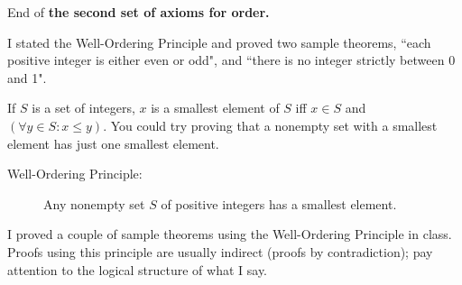 \documentclass[12pt]{article}
\begin{document}
End of {\bf the second set of axioms for order.}

I stated the Well-Ordering Principle and proved two sample theorems, ``each positive integer is either even or odd", and ``there is no integer strictly between 0 and 1".

If $S$ is a set of integers, $x$ is a smallest element of $S$ iff $x \in S$ and $(\forall y \in S:x \leq y)$.  You could try proving that a nonempty set with a smallest element has just one smallest element.

\begin{description}

\item[Well-Ordering Principle:]  Any nonempty set $S$ of positive integers has a smallest element.

\end{description}

I proved a couple of sample theorems using the Well-Ordering Principle in class.  Proofs using this principle are usually indirect (proofs by contradiction);  pay attention to the logical structure of what I say.
\end{document}
